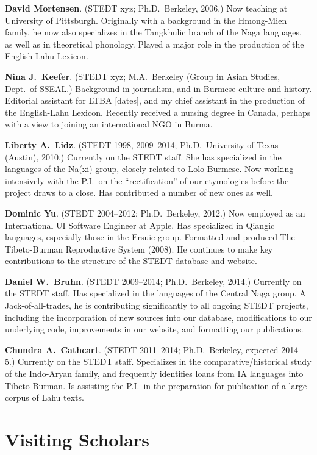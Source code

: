 \textbf{David Mortensen}. (STEDT xyz; Ph.D.\ Berkeley, 2006.) Now teaching at University of Pittsburgh. Originally with a background in the Hmong-Mien family, he now also specializes in the Tangkhulic branch of the Naga languages, as well as in theoretical phonology. Played a major role in the production of the English-Lahu Lexicon.

\textbf{Nina J.\ Keefer}. (STEDT xyz; M.A.\ Berkeley (Group in Asian Studies, Dept.\ of SSEAL.) Background in journalism, and in Burmese culture and history. Editorial assistant for LTBA [dates], and my chief assistant in the production of the English-Lahu Lexicon. Recently received a nursing degree in Canada, perhaps with a view to joining an international NGO in Burma.

\textbf{Liberty A.\ Lidz}. (STEDT 1998, 2009–2014; Ph.D.\ University of Texas (Austin), 2010.) Currently on the STEDT staff. She has specialized in the languages of the Na(xi) group, closely related to Lolo-Burmese. Now working intensively with the P.I.\ on the “rectification” of our etymologies before the project draws to a close. Has contributed a number of new ones as well.

\textbf{Dominic Yu}. (STEDT 2004–2012; Ph.D.\ Berkeley, 2012.) Now employed as an International UI Software Engineer at Apple. Has specialized in Qiangic languages, especially those in the Ersuic group. Formatted and produced The Tibeto-Burman Reproductive System (2008). He continues to make key contributions to the structure of the STEDT database and website.

\textbf{Daniel W.\ Bruhn}. (STEDT 2009–2014; Ph.D.\ Berkeley, 2014.) Currently on the STEDT staff. Has specialized in the languages of the Central Naga group. A Jack-of-all-trades, he is contributing significantly to all ongoing STEDT projects, including the incorporation of new sources into our database, modifications to our underlying code, improvements in our website, and formatting our publications.

\textbf{Chundra A.\ Cathcart}. (STEDT 2011–2014; Ph.D.\ Berkeley, expected 2014–5.) Currently on the STEDT staff. Specializes in the comparative/historical study of the Indo-Aryan family, and frequently identifies loans from IA languages into Tibeto-Burman. Is assisting the P.I.\ in the preparation for publication of a large corpus of Lahu texts.

\section{Visiting Scholars}

